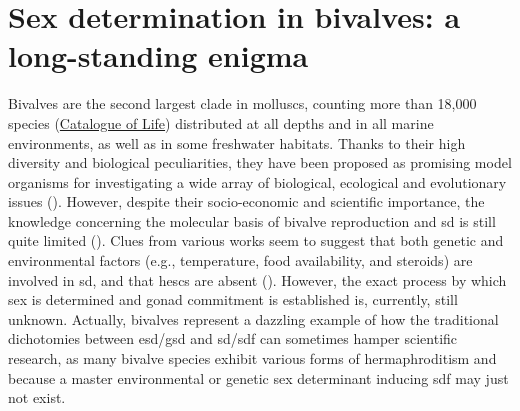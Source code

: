 \section{Sex determination in bivalves: a long-standing enigma}
Bivalves are the second largest clade in molluscs, counting more than 18,000 species (\href{https://www.catalogueoflife.org/}{Catalogue of Life}) distributed at all depths and in all marine environments, as well as in some freshwater habitats. Thanks to their high diversity and biological peculiarities, they have been proposed as promising model organisms for investigating a wide array of biological, ecological and evolutionary issues (\textbf{\cite{milani2020faraway,ghiselli2021bivalve}}). However, despite their socio-economic and scientific importance, the knowledge concerning the molecular basis of bivalve reproduction and \gls{sd} is still quite limited (\textbf{\cite{breton2018sex}}). Clues from various works seem to suggest that both genetic and environmental factors (e.g., temperature, food availability, and steroids) are involved in \gls{sd}, and that \glspl{hesc} are absent (\textbf{\cite{breton2018sex,han2022ancient}}). However, the exact process by which sex is determined and gonad commitment is established is, currently, still unknown. Actually, bivalves represent a dazzling example of how the traditional dichotomies between \gls{esd}/\gls{gsd} and \gls{sd}/\gls{sdf} can sometimes hamper scientific research, as many bivalve species exhibit various forms of hermaphroditism and because a master environmental or genetic sex determinant inducing \gls{sdf} may just not exist.

